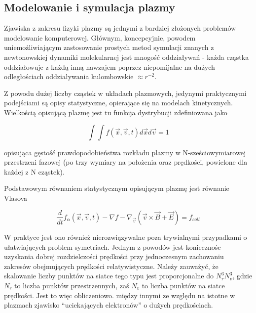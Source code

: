     \subsection{Modelowanie i symulacja plazmy}

    Zjawiska z zakresu fizyki plazmy są jednymi z bardziej złożonych problemów modelowanie komputerowej.
    Głównym, koncepcyjnie, powodem uniemożliwiającym zastosowanie prostych metod symulacji
    znanych z newtonowskiej dynamiki molekularnej jest mnogość oddziaływań - każda cząstka oddziałowuje
    z każdą inną nawzajem poprzez niepomijalne na dużych odległościach oddziaływania kulombowskie $\approx r^{-2}$.

    Z powodu dużej liczby cząstek w układach plazmowych, jedynymi praktycznymi podejściami są opisy statystyczne,
    opierające się na modelach kinetycznych. Wielkością opisującą plazmę jest tu funkcja dystrybucji zdefiniowana jako


    \begin{equation}
        \int \int f(\vec{x}, \vec{v}, t) d\vec{x} d\vec{v} = 1 %
        \label{eqn:distribution-function}
    \end{equation}


    opisująca gęstość prawdopodobieństwa rozkładu plazmy w N-sześciowymiarowej przestrzeni fazowej (po trzy wymiary na położenia
    oraz prędkości, powielone dla każdej z N cząstek).


    Podstawowym równaniem statystycznym opisującym plazmę jest równanie Vlasova %

    \begin{equation}
        \frac{ d} {dt} f_{\alpha} (\vec{x}, \vec{v}, t) - \nabla f - \nabla_{\vec{v}} (\vec{v} \times \vec{B} + \vec{E})= f_{coll}
        \label{eqn:Vlasov}
    \end{equation}

    W praktyce jest ono również nierozwiązywalne poza trywialnymi przypadkami o ułatwiających problem symetriach.
    Jednym z powodów jest koniecznośc uzyskania dobrej rozdzielczości prędkości
    przy jednoczesnym zachowaniu zakresów obejmujących prędkości relatywistyczne. Należy zauważyć, że skalowanie
    liczby punktów na siatce tego typu jest proporcjonalne do $N_r^3 N_v^3$, gdzie $N_r$ to liczba punktów przestrzennych, zaś
    $N_v$ to liczba punktów na siatce prędkości. Jest to więc %
    obliczeniowo. %
    między innymi ze względu na istotne w plazmach zjawisko ``uciekających elektronów'' o dużych prędkościach.

